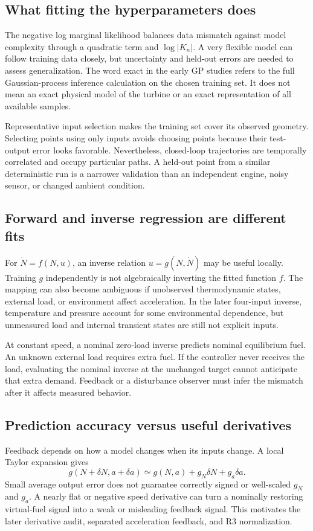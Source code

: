 \subsection{What fitting the hyperparameters does}
The negative log marginal likelihood balances data mismatch against model complexity through a quadratic term and $\log|K_n|$. A very flexible model can follow training data closely, but uncertainty and held-out errors are needed to assess generalization. The word exact in the early GP studies refers to the full Gaussian-process inference calculation on the chosen training set. It does not mean an exact physical model of the turbine or an exact representation of all available samples.

Representative input selection makes the training set cover its observed geometry. Selecting points using only inputs avoids choosing points because their test-output error looks favorable. Nevertheless, closed-loop trajectories are temporally correlated and occupy particular paths. A held-out point from a similar deterministic run is a narrower validation than an independent engine, noisy sensor, or changed ambient condition.

\subsection{Forward and inverse regression are different fits}
For $\dot N=f(N,u)$, an inverse relation $u=g(N,\dot N)$ may be useful locally. Training $g$ independently is not algebraically inverting the fitted function $f$. The mapping can also become ambiguous if unobserved thermodynamic states, external load, or environment affect acceleration. In the later four-input inverse, temperature and pressure account for some environmental dependence, but unmeasured load and internal transient states are still not explicit inputs.

At constant speed, a nominal zero-load inverse predicts nominal equilibrium fuel. An unknown external load requires extra fuel. If the controller never receives the load, evaluating the nominal inverse at the unchanged target cannot anticipate that extra demand. Feedback or a disturbance observer must infer the mismatch after it affects measured behavior.

\subsection{Prediction accuracy versus useful derivatives}
Feedback depends on how a model changes when its inputs change. A local Taylor expansion gives
\begin{equation}g(N+\delta N,a+\delta a)\simeq g(N,a)+g_N\delta N+g_a\delta a.
\end{equation}
Small average output error does not guarantee correctly signed or well-scaled $g_N$ and $g_a$. A nearly flat or negative speed derivative can turn a nominally restoring virtual-fuel signal into a weak or misleading feedback signal. This motivates the later derivative audit, separated acceleration feedback, and R3 normalization.

